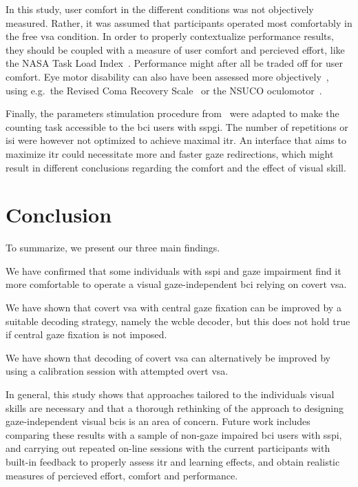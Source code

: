 In this study, user comfort in the different conditions was not objectively
measured.
Rather, it was assumed that participants operated most comfortably in the free
\ac{vsa} condition.
In order to properly contextualize performance results, they should be coupled
with a measure of user comfort and percieved effort, like the NASA Task Load
Index~\cite{Hart2006}.
Performance might after all be traded off for user comfort.
Eye motor disability can also have been assessed more
objectively~\cite{FriedOken2020}, using e.g.\
the Revised Coma Recovery Scale~\cite{Giacino2004} or the NSUCO
oculomotor~\cite{Maples1992}.


Finally, the parameters stimulation procedure
from~\textcite{VanDenKerchove2024} were adapted to make the counting task
accessible to the \ac{bci} users with \ac{sspgi}.
The number of repetitions or \ac{isi} were however not optimized to achieve
maximal \ac{itr}.
An interface that aims to maximize \ac{itr} could necessitate more and faster
gaze redirections, which might result in different conclusions regarding the
comfort and the effect of visual skill.

\section{Conclusion}

To summarize, we present our three main findings.
\begin{enumerate*}
  \item We have confirmed that some individuals with \ac{sspi} and gaze
    impairment find it more comfortable to operate a visual gaze-independent
    \ac{bci} relying on covert \acf{vsa}.
  \item We have shown that covert \acf{vsa} with central gaze fixation can be
    improved by a suitable decoding strategy, namely the \acf{wcble} decoder,
    but this does not hold true if central gaze fixation is not imposed.
  \item We have shown that decoding of covert \ac{vsa}
    can alternatively be improved by
    using a calibration session with attempted overt \ac{vsa}.
\end{enumerate*}

In general, this study shows that approaches tailored to the individuals visual
skills are necessary and that a thorough rethinking of the approach to
designing gaze-independent visual \acp{bci} is an area of concern.
Future work includes comparing these results with a sample of non-gaze impaired
\ac{bci} users with \ac{sspi},
and carrying out repeated on-line sessions with the current participants with built-in feedback to
properly assess \ac{itr} and learning effects, and obtain realistic measures of percieved effort,
comfort and performance.
